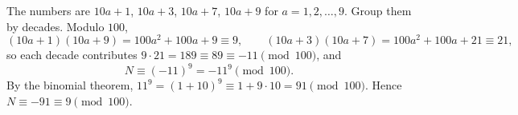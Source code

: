 The numbers are $10a+1$, $10a+3$, $10a+7$, $10a+9$ for $a=1,2,\dots,9$. Group them by decades. Modulo $100$,
\[
(10a+1)(10a+9)=100a^2+100a+9\equiv9,\qquad(10a+3)(10a+7)=100a^2+100a+21\equiv21 ,
\]
so each decade contributes $9\cdot21=189\equiv89\equiv-11\pmod{100}$, and
\[
N\equiv(-11)^9=-11^9\pmod{100}.
\]
By the binomial theorem, $11^9=(1+10)^9\equiv1+9\cdot10=91\pmod{100}$. Hence $N\equiv-91\equiv\boxed{9}\pmod{100}$.

